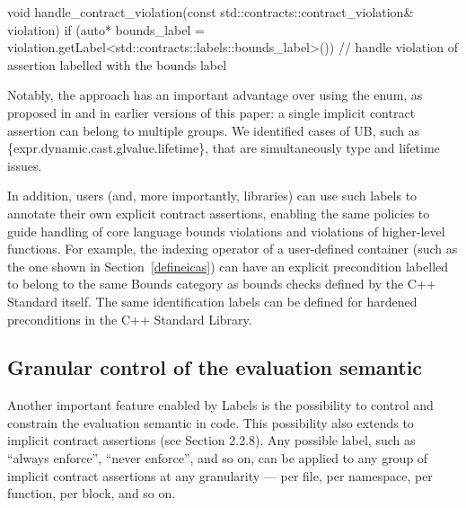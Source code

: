 \begin{codeblock}
void handle_contract_violation(const std::contracts::contract_violation& violation)
{
  if (auto* bounds_label =
      violation.getLabel<std::contracts::labels::bounds_label>()) {
      // handle violation of assertion labelled with the bounds label
  }
}
\end{codeblock} 

%
%

Notably, the \cite{P3400R1} approach has an important advantage over using the  enum, as proposed in \cite{P3081R1} and in earlier versions of this paper: a single implicit contract assertion can belong to multiple groups. We identified cases of UB, such as \{expr.dynamic.cast.glvalue.lifetime\}, that are simultaneously type and lifetime issues.

In addition, users (and, more importantly, libraries) can use such labels to annotate their own explicit contract assertions, enabling the same policies to guide handling of core language bounds violations and violations of higher-level functions. For example, the indexing operator of a user-defined container (such as the one shown in Section~\ref{defineicas}) can have an explicit precondition labelled to belong to the same Bounds category as bounds checks defined by the C++ Standard itself. The same identification labels can be defined for hardened preconditions in the C++ Standard Library.

\subsection{Granular control of the evaluation semantic}
\label{semantic}

Another important feature enabled by Labels is the possibility to control and constrain the evaluation semantic in code. This possibility also extends to implicit contract assertions (see \cite{P3400R1} Section 2.2.8). Any possible label, such as ``always enforce'', ``never enforce'', and so on, can be applied to any group of implicit contract assertions at any granularity --- per file, per namespace, per function, per block, and so on.

